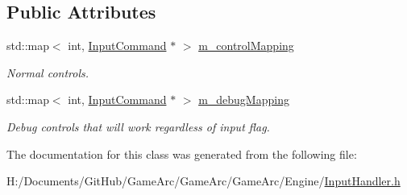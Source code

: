 \subsection*{Public Attributes}
\begin{DoxyCompactItemize}
\item 
\hypertarget{class_input_handler_abe853597d11b94e0668c8db6638a0548}{std\+::map$<$ int, \hyperlink{class_input_command}{Input\+Command} $\ast$ $>$ \hyperlink{class_input_handler_abe853597d11b94e0668c8db6638a0548}{m\+\_\+control\+Mapping}}\label{class_input_handler_abe853597d11b94e0668c8db6638a0548}

\begin{DoxyCompactList}\small\item\em Normal controls. \end{DoxyCompactList}\item 
\hypertarget{class_input_handler_ab472e9acd5163f068a3d009f8415fab1}{std\+::map$<$ int, \hyperlink{class_input_command}{Input\+Command} $\ast$ $>$ \hyperlink{class_input_handler_ab472e9acd5163f068a3d009f8415fab1}{m\+\_\+debug\+Mapping}}\label{class_input_handler_ab472e9acd5163f068a3d009f8415fab1}

\begin{DoxyCompactList}\small\item\em Debug controls that will work regardless of input flag. \end{DoxyCompactList}\end{DoxyCompactItemize}


The documentation for this class was generated from the following file\+:\begin{DoxyCompactItemize}
\item 
H\+:/\+Documents/\+Git\+Hub/\+Game\+Arc/\+Game\+Arc/\+Game\+Arc/\+Engine/\hyperlink{_input_handler_8h}{Input\+Handler.\+h}\end{DoxyCompactItemize}
